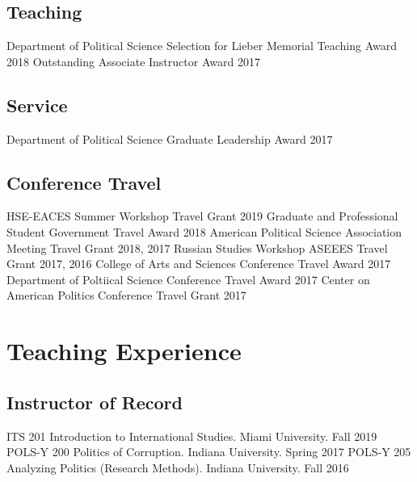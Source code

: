 \documentclass[11pt,]{article}
\begin{document}
\hypertarget{teaching}{%
\subsection{Teaching}\label{teaching}}

Department of Political Science Selection for Lieber Memorial Teaching
Award \hfill 2018 \newline Outstanding Associate Instructor Award
\hfill 2017

\hypertarget{service}{%
\subsection{Service}\label{service}}

Department of Political Science Graduate Leadership Award \hfill 2017

\hypertarget{conference-travel}{%
\subsection{Conference Travel}\label{conference-travel}}

HSE-EACES Summer Workshop Travel Grant \hfill 2019 \newline Graduate and
Professional Student Government Travel Award \hfill 2018 \newline
American Political Science Association Meeting Travel Grant \hfill 2018,
2017 \newline Russian Studies Workshop ASEEES Travel Grant \hfill 2017,
2016 \newline College of Arts and Sciences Conference Travel Award
\hfill 2017 \newline Department of Poltiical Science Conference Travel
Award \hfill 2017 \newline Center on American Politics Conference Travel
Grant \hfill 2017

\hypertarget{teaching-experience}{%
\section{Teaching Experience}\label{teaching-experience}}

\hypertarget{instructor-of-record}{%
\subsection{Instructor of Record}\label{instructor-of-record}}

ITS 201 Introduction to International Studies. Miami University.
\hfill Fall 2019 \newline POLS-Y 200 Politics of Corruption. Indiana
University. \hfill Spring 2017 \newline POLS-Y 205 Analyzing Politics
(Research Methods). Indiana University. \hfill Fall 2016
\end{document}
